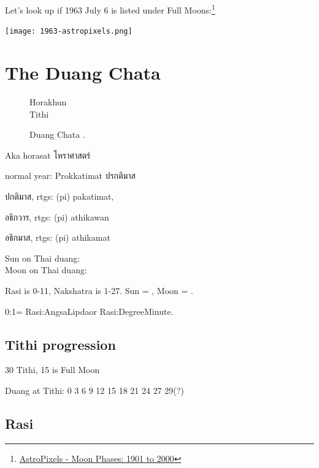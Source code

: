 \documentclass[11pt,oneside]{memoir-article}
\begin{document}
\bigskip

Let's look up if 1963 July 6 is listed under Full Moons:\footnote{\href{http://astropixels.com/ephemeris/phasescat/phases1901.html}{AstroPixels - Moon Phases: 1901 to 2000}}

\bigskip

{\centering
\texttt{[image: 1963-astropixels.png]}
\par}

\label{calculating-the-sun-and-moon-end}

\clearpage

\chapter{The Duang Chata}
\label{sec-5}
\label{duangchata}

\begin{figure}[h]
\caption{Duang Chata .}
\resizebox{\linewidth}{!}{\DuangChata[Sun={2/0/0}, Moon={4/5/10}, fancy]}

Horakhun\\
Tithi

\end{figure}

Aka horasat โหราศาสตร์

normal year: Prokkatimat ปรกติมาส

ปกติมาส, rtgs: (pi) pakatimat,

อธิกวาร, rtgs: (pi) athikawan

อธิกมาส, rtgs: (pi) athikamat

Sun on Thai duang: \\
Moon on Thai duang: 

Rasi is 0-11, Nakshatra is 1-27. Sun = \theSun, Moon = \theMoon.

0:1\minute = Rasi:Angsa\degree Lipda\minute or Rasi:Degree\degree Minute\minute.

\label{duangchata-end}

\section{Tithi progression}
\label{sec-5-1}

30 Tithi, 15 is Full Moon

Duang at Tithi: 0 3 6 9 12 15 18 21 24 27 29(?)

\section{Rasi}
\label{sec-5-2}
\end{document}
